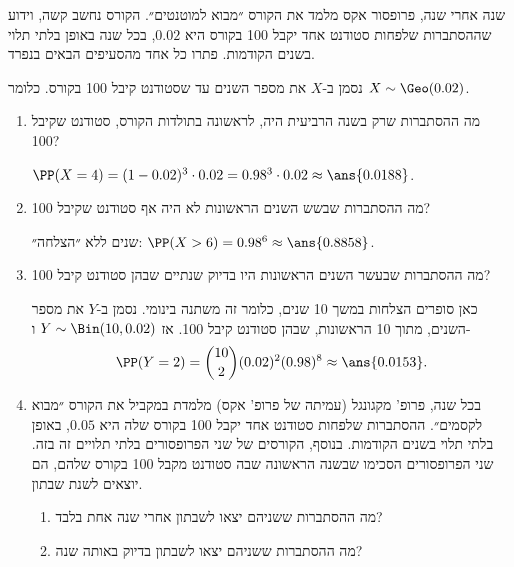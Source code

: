 שנה אחרי שנה, פרופסור אקס מלמד את הקורס ״מבוא למוטנטים״. הקורס נחשב קשה, וידוע שההסתברות שלפחות סטודנט אחד יקבל 100 בקורס היא $0.02$, בכל שנה באופן בלתי תלוי בשנים הקודמות. פתרו כל אחד מהסעיפים הבאים בנפרד.
\begin{solbox}
\unverified
נסמן ב-$X$ את מספר השנים עד שסטודנט קיבל 100 בקורס. כלומר $X\sim\Geo(0.02)$.
\end{solbox}
\begin{enumerate}
\item מה ההסתברות שרק בשנה הרביעית היה, לראשונה בתולדות הקורס, סטודנט שקיבל 100?
\begin{solbox}
\unverified
$\PP(X=4)=(1-0.02)^3\cdot0.02=0.98^3\cdot0.02\approx\ans{0.0188}$.
\end{solbox}
\item מה ההסתברות שבשש השנים הראשונות לא היה אף סטודנט שקיבל 100?
\begin{solbox}
 שנים ללא ״הצלחה״: $\PP(X>6)=0.98^6\approx\ans{0.8858}$.
\end{solbox}
\item מה ההסתברות שבעשר השנים הראשונות היו בדיוק שנתיים שבהן סטודנט קיבל 100?
\begin{solbox}
\unverified
כאן סופרים הצלחות במשך 10 שנים, כלומר זה משתנה בינומי. נסמן ב-$Y$ את מספר השנים, מתוך 10 הראשונות, שבהן סטודנט קיבל 100. אז $Y\sim\Bin(10,0.02)$ ו-
\[
\PP(Y=2)=\binom{10}2(0.02)^2(0.98)^8\approx\ans{0.0153}.
\]
\end{solbox}
\item בכל שנה, פרופ' מקגונגל (עמיתה של פרופ' אקס) מלמדת במקביל את הקורס ״מבוא לקסמים״. ההסתברות שלפחות סטודנט אחד יקבל 100 בקורס שלה היא $0.05$, באופן בלתי תלוי בשנים הקודמות. בנוסף, הקורסים של שני הפרופסורים בלתי תלויים זה בזה.
שני הפרופסורים הסכימו שבשנה הראשונה שבה סטודנט מקבל 100 בקורס שלהם, הם יוצאים לשנת שבתון.
\begin{enumerate}
\item מה ההסתברות ששניהם יצאו לשבתון אחרי שנה אחת בלבד?
\item מה ההסתברות ששניהם יצאו לשבתון בדיוק באותה שנה?
\end{enumerate}
\begin{solbox}

\end{solbox}
\end{enumerate}
